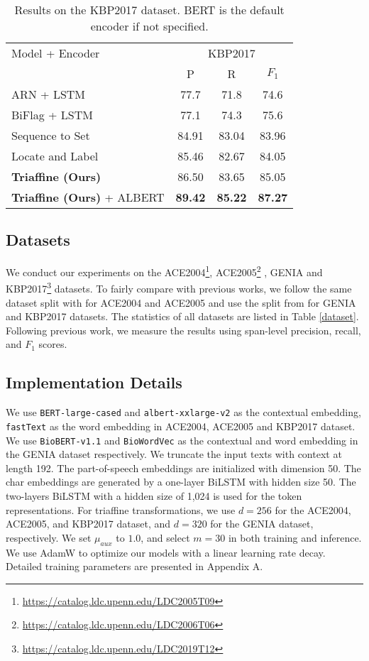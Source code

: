 \documentclass[11pt]{article}
\begin{document}
\begin{table}[t]
\centering
\small
\begin{tabular}{lccc}
\toprule
Model + Encoder & \multicolumn{3}{c}{KBP2017}  \\
& P & R & $F_1$ \\
\midrule
ARN + LSTM & 77.7 & 71.8 & 74.6 \\
BiFlag + LSTM & 77.1 & 74.3 & 75.6 \\
Sequence to Set & 84.91 & 83.04 & 83.96  \\
Locate and Label & 85.46 & 82.67 & 84.05 \\
\midrule
{\bf Triaffine (Ours)} & 86.50 & 83.65 & 85.05 \\
{\bf Triaffine (Ours)} + ALBERT & \textbf{89.42} & \textbf{85.22} & \textbf{87.27}  \\
\bottomrule
\end{tabular}
\caption{Results on the KBP2017 dataset. BERT is the default encoder if not specified.}
\label{main kbp}
\end{table}


\subsection{Datasets}
We conduct our experiments on the ACE2004\footnote{\url{https://catalog.ldc.upenn.edu/LDC2005T09}}, ACE2005\footnote{\url{https://catalog.ldc.upenn.edu/LDC2006T06}} \cite{ace04}, GENIA \cite{kim2003genia} and KBP2017\footnote{\url{https://catalog.ldc.upenn.edu/LDC2019T12}} \cite{ji2017overview} datasets.
To fairly compare with previous works, we follow the same dataset split with \citet{lu2015joint} for ACE2004 and ACE2005 and use the split from \citet{lin2019sequence} for GENIA and KBP2017 datasets.
The statistics of all datasets are listed in Table \ref{dataset}.
Following previous work, we measure the results using span-level precision, recall, and $F_1$ scores.


\subsection{Implementation Details} \label{detail}
We use \texttt{BERT-large-cased} \cite{devlin-etal-2019-bert} and \texttt{albert-xxlarge-v2} \cite{lan2019albert} as the contextual embedding, \texttt{fastText} \cite{fasttext} as the word embedding in ACE2004, ACE2005 and KBP2017 dataset.
We use \texttt{BioBERT-v1.1} \cite{lee2020biobert} and \texttt{BioWordVec} \cite{zhang2019biowordvec}
as the contextual and word embedding in the GENIA dataset respectively.
We truncate the input texts with context at length 192.
The part-of-speech embeddings are initialized with dimension 50. The char embeddings are generated by a one-layer BiLSTM with hidden size 50.
The two-layers BiLSTM with a hidden size of 1,024 is used for the token representations.
For triaffine transformations, we use $d=256$ for the ACE2004, ACE2005, and KBP2017 dataset, and $d=320$ for the GENIA dataset, respectively.
We set $\mu_{aux}$ to $1.0$, and  select $m=30$ in both training and inference.
We use AdamW \cite{loshchilov2017decoupled} to optimize our models with a linear learning rate decay.
Detailed training parameters are presented in Appendix A.
\end{document}
